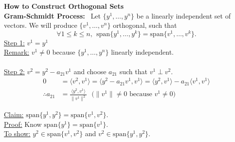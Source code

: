 \documentclass[letterpaper]{article}
\begin{document}
\textbf{How to Construct  Orthogonal Sets}\\
    \textbf{Gram-Schmidt Process:}~ Let $\{y^1, \ldots ,y^n\}$ be a linearly independent set of vectors. We will produce $\{v^1, \ldots, v^n\}$ orthogonal, such that
    \begin{equation*}
        \forall 1 \leq k \leq n,\ \ \text{span}\{y^1, \ldots, y^k\}=\text{span}\{v^1, \ldots, v^k\}.
    \end{equation*}
    \underline{Step 1:} $v^1=y^1$\\
    \underline{Remark:} $v^1 \neq 0$ because $\{y^1, \ldots, y^n\}$ linearly independent.\\
    \\
    \underline{Step 2:} $v^2 = y^2-a_{21}v^1$ and choose $a_{21}$ such that $v^1 \perp v^2$.
    \begin{align*}
        0 &=  \langle v^2, v^1 \rangle =  \langle y^2 - a_{21}v^1, v^1 \rangle=  \langle y^2,v^1 \rangle  - a_{21} \langle v^1,v^1 \rangle\\
        \therefore a_{21}&=\frac{ \langle y^2,v^1 \rangle }{\|v^1\|^2}\ \ \ \mbox{($\|v^1\| \neq 0$ because $v^1 \neq 0$)}
    \end{align*}

    \underline{Claim:} $\text{span}\{y^1, y^2\}=\text{span}\{v^1, v^2\}$.\\
    \underline{Proof:} Know $\text{span}\{y^1\}=\text{span}\{v^1\}$.\\
    \underline{To show:} $y^2 \in  \text{span}\{v^1, v^2\}$ and $v^2 \in \text{span}\{y^1, y^2\}.$
\end{document}
